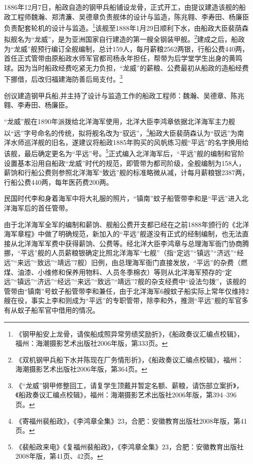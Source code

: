 \documentclass[12pt,UTF8]{ctexbook}
\begin{document}
1886年12月7日，船政自造的钢甲兵船铺设龙骨，正式开工，由提议建造该舰的船政工程师魏瀚、郑清濂、吴德章负责舰体的设计与监造，陈兆翱、李寿田、杨廉臣负责配套轮机的设计与监造。\footnote{《钢甲船安上龙骨，请俟船成照异常劳绩奖励折》，《船政奏议汇编点校辑》，福州：海潮摄影艺术出版社2006年版，第333页。}该舰至1888年1月29日顺利下水，由船政大臣裴荫森拟舰名为“龙威”，是为亚洲国家自行建造的第一艘全钢装甲舰。\footnote{《双机钢甲兵船下水并陈现在厂务情形折》，《船政奏议汇编点校辑》，福州：海潮摄影艺术出版社2006年版，第364页。}建成之后，船政为“龙威”舰预行编订全舰编制，总计159人，每月薪粮2562两银，行船公费440两，首任正式管带由原船政水师军官都司杨永年担任，帮带为后学堂学生出身的黄鸣球。因为当时船政经费吃紧无力负担，“龙威”的薪粮、公费最初从船政的造船经费下挪借，后改归福建海防善后局支付。\footnote{《“龙威”钢甲修整回工，请复学生顶戴并暂定名额、薪粮，请饬部立案折》，《船政奏议汇编点校辑》，福州：海潮摄影艺术出版社2006年版，第394--396页。}

创议建造钢甲兵船,并主持了设计与监造工作的船政工程师：魏瀚、吴德章、陈兆翱、李寿田、杨廉臣。

“龙威”舰在1890年派拨给北洋海军使用，北洋大臣李鸿章依据北洋海军主力舰以“远”字号命名的传统，拟将舰名改为“驭远”，\footnote{《寄福州裴船政》，《李鸿章全集》23，合肥：安徽教育出版社2008年版，第41页。}船政大臣裴荫森认为“驭远”为南洋水师巡洋舰的旧名，遂建议将船政1885年购买的风帆练习舰“平远”的名字换用给该舰，最后确定更名为“平远”号。\footnote{《裴船政来电》《复福州裴船政》，《李鸿章全集》23，合肥：安徽教育出版社2008年版，第41页、42页。}正式编入北洋海军后，“平远”舰的编制和官阶设置基本沿用自船政“龙威”时代的规范，即管带为都司阶级，全舰编制为158人，薪饷和行船公费则参照北洋海军“致远”舰的标准略微从减，计每月薪粮银2387两，行船公费440两，每年医药费200两。

民国时代李和身着海军中将大礼服的照片，“镇南”蚊子船管带李和是“平远”进入北洋海军后的首任管带。

由于北洋海军全军的编制和薪饷、舰船公费开支都已经在之前1888年颁行的《北洋海军章程》中做了明确规范，新加入的“平远”舰遂没有正式的经制编制，也无法直接从北洋海军军费中获得薪饷、公费等。经北洋大臣李鸿章与总理海军衙门协商腾挪，“平远”舰的人员薪粮银确定比照北洋海军“七舰”（指“定远”“镇远”“济远”“经远”“来远”“致远”“靖远”7舰）旧例，由总理海军衙门直接发放，“平远”的杂费（燃煤、油漆、小维修和保养用物料、人员冬季棉衣）等则从北洋海军预存的“定远”“镇远”“济远”“经远”“来远”“致远”“靖远”7舰的杂支经费中“设法匀拨”，该舰的管带由“镇南”号蚊子船管带李和兼任，由于北洋海军6艘蚊子船实际上常年仅维持2艘在役，事实上李和则成为“平远”的专职管带，除李和外，推测“平远”舰的军官多有从蚁子船军官中借用的情况。
\end{document}
